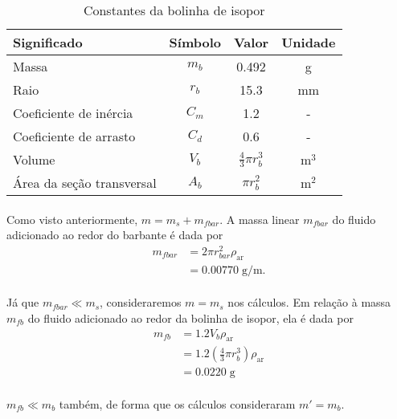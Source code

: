 \documentclass[a4paper,11pt]{scrartcl} %
\numberwithin{equation}{section} %
\numberwithin{figure}{section} %
\numberwithin{table}{section} %
\begin{document}
\begin{table}[!ht]
	\centering
	\begin{tabular}{|l|c|c|c|}
		\hline
		\textbf{Significado} & \textbf{Símbolo} & \textbf{Valor} & \textbf{Unidade}\\ \hline \hline
		Massa & $m_{b}$ & 0.492 & g\\ \hline
		Raio & $r_{b}$ & 15.3 & mm\\ \hline
		Coeficiente de inércia & $C_m$ & 1.2 & - \\ \hline
		Coeficiente de arrasto & $C_d$ & 0.6 & - \\ \hline
		Volume & $V_b$ & $\frac{4}{3}\pi r_b^3$ & $\textrm{m}^3$ \\ \hline
		Área da seção transversal & $A_b$ & $\pi r_b^2$ & m$^2$\\ \hline
	\end{tabular}
	\caption{Constantes da bolinha de isopor}
\end{table}

\paragraph{} Como visto anteriormente, $m = m_s + m_{fbar}$. A massa linear $m_{fbar}$ do fluido adicionado ao redor do barbante é dada por \begin{align}
	m_{fbar} &=  2 \pi r_{bar}^2 \rho_{\mathrm{ar}}\nonumber\\
	&= 0.00770\;\mathrm{g/m}.
\end{align} 

\paragraph{} Já que $m_{fbar} \ll m_s$, consideraremos $m = m_s$ nos cálculos. Em relação à massa $m_{fb}$ do fluido adicionado ao redor da bolinha de isopor, ela é dada por\begin{align}
	m_{fb} &= 1.2 V_{b} \rho_{\mathrm{ar}}\nonumber\\
	&= 1.2 \left(\frac{4}{3}\pi r_b^3\right)\rho_{\mathrm{ar}}\nonumber\\
	&= 0.0220\;\textrm{g}
\end{align}

\paragraph{} $m_{fb} \ll m_{b}$ também, de forma que os cálculos consideraram $m' = m_b$.
\end{document}
